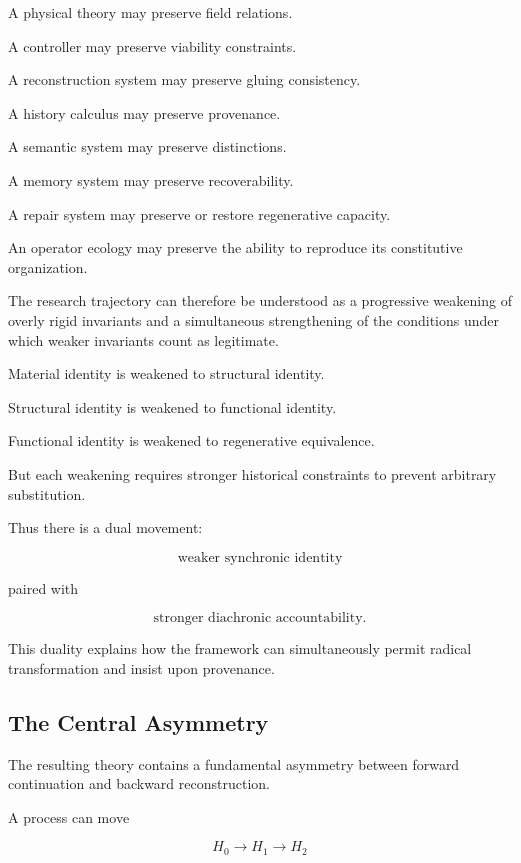 \documentclass[11pt]{article}
\theoremstyle{remark}
\begin{document}
A physical theory may preserve field relations.

A controller may preserve viability constraints.

A reconstruction system may preserve gluing consistency.

A history calculus may preserve provenance.

A semantic system may preserve distinctions.

A memory system may preserve recoverability.

A repair system may preserve or restore regenerative capacity.

An operator ecology may preserve the ability to reproduce its constitutive organization.

The research trajectory can therefore be understood as a progressive weakening of overly rigid invariants and a simultaneous strengthening of the conditions under which weaker invariants count as legitimate.

Material identity is weakened to structural identity.

Structural identity is weakened to functional identity.

Functional identity is weakened to regenerative equivalence.

But each weakening requires stronger historical constraints to prevent arbitrary substitution.

Thus there is a dual movement:

\begin{equation}
\text{weaker synchronic identity}
\end{equation}

paired with

\begin{equation}
\text{stronger diachronic accountability}.
\end{equation}

This duality explains how the framework can simultaneously permit radical transformation and insist upon provenance.

\subsection{The Central Asymmetry}

The resulting theory contains a fundamental asymmetry between forward continuation and backward reconstruction.

A process can move

\begin{equation}
H_0
\rightarrow
H_1
\rightarrow
H_2
\end{equation}
\end{document}
